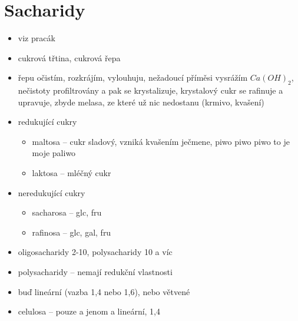 \documentclass{article}
\begin{document}
\section{Sacharidy}
\begin{itemize}
  \item viz pracák
  \item cukrová třtina, cukrová řepa
  \item řepu očistím, rozkrájím, vylouhuju, nežadoucí příměsi vysrážím $Ca(OH)_2$, nečistoty profiltrovány a pak se krystalizuje, krystalový cukr se rafinuje a upravuje, zbyde melasa, ze které už nic nedostanu (krmivo, kvašení)
  \item redukující cukry
  \begin{itemize}
    \item maltosa -- cukr sladový, vzniká kvašením ječmene, piwo piwo piwo to je moje paliwo
    \item laktosa -- mléčný cukr
  \end{itemize}
  \item neredukující cukry
  \begin{itemize}
    \item sacharosa -- glc, fru
    \item rafinosa -- glc, gal, fru
  \end{itemize}
  \item oligosacharidy 2-10, polysacharidy 10 a víc
  \item polysacharidy -- nemají redukční vlastnosti
  \item buď lineární (vazba 1,4 nebo 1,6), nebo větvené
  \item celulosa -- pouze a jenom a lineární, 1,4
\end{itemize}
\end{document}
